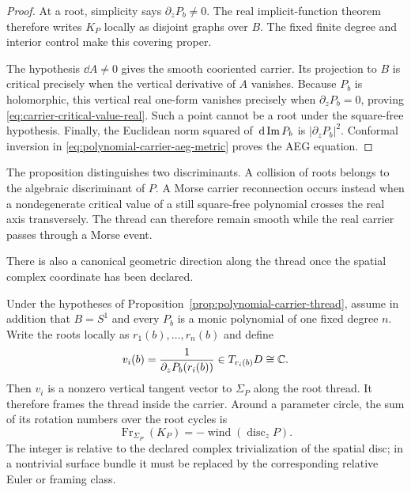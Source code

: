 \begin{proof}
At a root, simplicity says $\partial_zP_b\ne0$.  The real implicit-function
theorem therefore writes $K_P$ locally as disjoint graphs over $B$.  The fixed
finite degree and interior control make this covering proper.

The hypothesis $\dd A\ne0$ gives the smooth cooriented carrier.  Its projection
to $B$ is critical precisely when the vertical derivative of $A$ vanishes.
Because $P_b$ is holomorphic, this vertical real one-form vanishes precisely
when $\partial_zP_b=0$, proving \eqref{eq:carrier-critical-value-real}.  Such a
point cannot be a root under the square-free hypothesis.  Finally,
the Euclidean norm squared of $\,\mathrm{d}\operatorname{Im} P_b$ is
$|\partial_zP_b|^2$.  Conformal inversion in
\eqref{eq:polynomial-carrier-aeg-metric} proves the AEG equation.
\end{proof}

The proposition distinguishes two discriminants.  A collision of roots belongs
to the algebraic discriminant of $P$.  A Morse carrier reconnection occurs
instead when a nondegenerate critical value of a still square-free polynomial
crosses the real axis transversely.
The thread can therefore remain smooth while the real carrier passes through a
Morse event.

There is also a canonical geometric direction along the thread once the spatial
complex coordinate has been declared.

\begin{proposition}
\label{prop:carrier-framing-discriminant}
Under the hypotheses of Proposition~\ref{prop:polynomial-carrier-thread}, assume
in addition that $B=S^1$ and every $P_b$ is a monic polynomial of one fixed
degree $n$.  Write
the roots locally as $r_1(b),\ldots,r_n(b)$ and define
\begin{equation}
 v_i(b)=\frac{1}{\partial_zP_b(r_i(b))}\in T_{r_i(b)}D\cong\mathbb{C}.
 \label{eq:polynomial-carrier-framing-vector}
\end{equation}
Then $v_i$ is a nonzero vertical tangent vector to $\Sigma_P$ along the root
thread.  It therefore frames the thread inside the carrier.  Around a parameter
circle, the sum of its rotation numbers over the root cycles is
\begin{equation}
 \operatorname{Fr}_{\Sigma_P}(K_P)
 =-\operatorname{wind}\!\left(\operatorname{disc}_zP\right).
 \label{eq:carrier-framing-discriminant-period}
\end{equation}
The integer is relative to the declared complex trivialization of the spatial
disc; in a nontrivial surface bundle it must be replaced by the corresponding
relative Euler or framing class.
\end{proposition}


